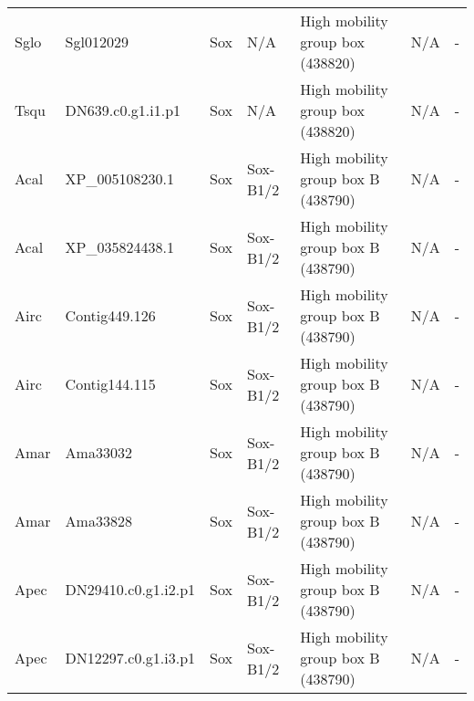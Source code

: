 \documentclass[../main.tex]{subfiles}
\begin{document}
\begin{landscape}
\begin{longtable}{lllllll}
		Sglo           & Sgl012029             & Sox            & N/A                 & High mobility group box (438820)            & N/A                                                                    & -                    \\
		Tsqu           & DN639.c0.g1.i1.p1     & Sox            & N/A                 & High mobility group box (438820)            & N/A                                                                    & -                    \\
		Acal           & XP\_005108230.1       & Sox            & Sox-B1/2            & High mobility group box B (438790)          & N/A                                                                    & -                    \\
		Acal           & XP\_035824438.1       & Sox            & Sox-B1/2            & High mobility group box B (438790)          & N/A                                                                    & -                    \\
		Airc           & Contig449.126         & Sox            & Sox-B1/2            & High mobility group box B (438790)          & N/A                                                                    & -                    \\
		Airc           & Contig144.115         & Sox            & Sox-B1/2            & High mobility group box B (438790)          & N/A                                                                    & -                    \\
		Amar           & Ama33032              & Sox            & Sox-B1/2            & High mobility group box B (438790)          & N/A                                                                    & -                    \\
		Amar           & Ama33828              & Sox            & Sox-B1/2            & High mobility group box B (438790)          & N/A                                                                    & -                    \\
		Apec           & DN29410.c0.g1.i2.p1   & Sox            & Sox-B1/2            & High mobility group box B (438790)          & N/A                                                                    & -                    \\
		Apec           & DN12297.c0.g1.i3.p1   & Sox            & Sox-B1/2            & High mobility group box B (438790)          & N/A                                                                    & -                    \\

\end{longtable}
\end{landscape}
\end{document}
